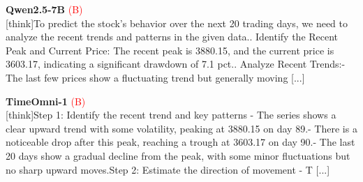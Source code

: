 \noindent
\begin{minipage}[t]{0.28\textwidth}
\colorbox{red!8}{\parbox{\dimexpr\textwidth-2\fboxsep}{
\textbf{Qwen2.5-7B} \textcolor{red}{(B)} \\[2pt]
\tiny
[think]\newline To predict the stock's behavior over the next 20 trading days, we need to analyze the recent trends and patterns in the given data.. Identify the Recent Peak and Current Price: The recent peak is 3880.15, and the current price is 3603.17, indicating a significant drawdown of 7.1 pct.. Analyze Recent Trends:\newline    - The last few prices show a fluctuating trend but generally moving  [...]
}}
\end{minipage}
\hfill
\begin{minipage}[t]{0.28\textwidth}
\colorbox{red!8}{\parbox{\dimexpr\textwidth-2\fboxsep}{
\textbf{TimeOmni-1} \textcolor{red}{(B)} \\[2pt]
\tiny
[think]\newline Step 1: Identify the recent trend and key patterns  \newline - The series shows a clear upward trend with some volatility, peaking at 3880.15 on day 89.\newline - There is a noticeable drop after this peak, reaching a trough at 3603.17 on day 90.\newline - The last 20 days show a gradual decline from the peak, with some minor fluctuations but no sharp upward moves.\newline Step 2: Estimate the direction of movement  \newline - T [...]
}}
\end{minipage}
\hfill
